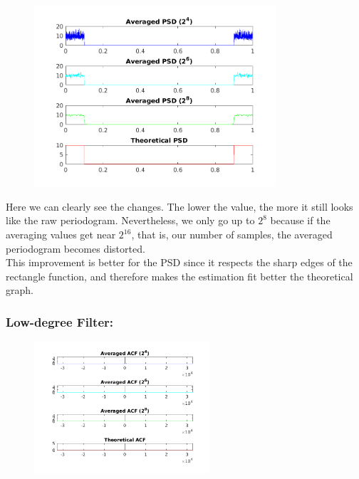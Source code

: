 \documentclass[a4paper,11pt]{article}
\begin{document}
\begin{figure}[!hp]
    \begin{center}
      \includegraphics[width=0.8\textwidth]{images/study2/psd_hd_aver.png}
    \end{center}
\end{figure}

Here we can clearly see the changes. The lower the value, the more it still
looks like the raw periodogram. Nevertheless, we only go up to $2^8$ because if
the averaging values get near $2^{16}$, that is, our number of samples, the
averaged periodogram becomes distorted. \\

This improvement is better for the PSD since it respects the sharp edges of the
rectangle function, and therefore makes the estimation fit better the
theoretical graph.

\newpage

\subsubsection{Low-degree Filter:}

\begin{figure}[!hp]
    \begin{center}
      \includegraphics[width=0.58\textwidth]{images/study2/acf_ld_aver_plot.png}
    \end{center}
\end{figure}
\end{document}
